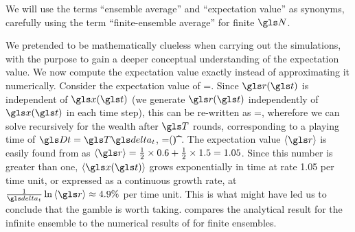We will
use the terms ``ensemble average'' and ``expectation value'' as synonyms, 
carefully using the term ``finite-ensemble average'' for finite $\N$.
%
%

We pretended to be mathematically clueless when carrying out the simulations,
with the purpose to gain a deeper conceptual understanding of the expectation 
value. We now compute the expectation value exactly instead of 
approximating it numerically. Consider the expectation value of   
\be
\ave{\x(\t+\dt)}=\ave{\x(\t)\gr(\t)}. 
\ee
Since $\gr(\t)$ is independent of $\x(\t)$ (we generate $\gr(\t)$ 
independently of $\x(\t)$ in each time step), this can be re-written as
\be
\ave{\x(\t+\dt)}=\ave{\x(\t)}\ave{\gr},
\ee
wherefore we can solve recursively for the wealth after $\T$ rounds, corresponding to a playing time of $\Dt=\T\dt$,
\be
\ave{\x(\t+\T\dt)}=\x(\t)\ave{\gr}^\T.
\ee
The expectation value $\ave{\gr}$ is easily found from  
as $\ave{\gr}=\frac{1}{2}\times 0.6 + \frac{1}{2}\times 1.5=1.05$. Since 
this number is greater than one, $\ave{\x(\t)}$ grows exponentially in 
time at rate 1.05 per time unit, or expressed as a continuous 
growth rate, at $\frac{1}{\dt}\ln \ave{\gr}\approx4.9\%$ per time 
unit. This is what might have led us to
conclude that the gamble is worth taking.  compares the
analytical result for the infinite ensemble to the numerical results 
of  for finite ensembles.

